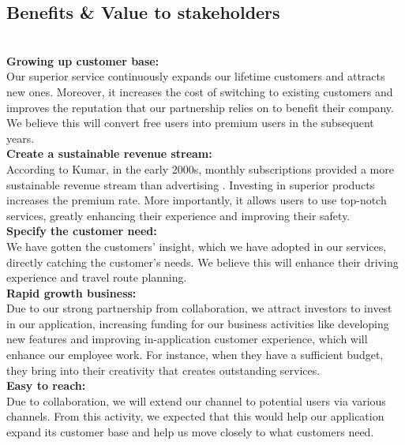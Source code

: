 \documentclass[12pt,a4paper]{article}
\begin{document}
\subsection {Benefits \& Value to stakeholders} \\
\noindent \textbf {Growing up customer base:} \\
\noindent  Our superior service continuously expands our lifetime customers and attracts new ones. Moreover, it increases the cost of switching to existing customers and improves the reputation that our partnership relies on to benefit their company. We believe this will convert free users into premium users in the subsequent years.\\

\noindent \textbf {Create a sustainable revenue stream:} \\
\noindent  According to Kumar, in the early 2000s, monthly subscriptions provided a more sustainable revenue stream than advertising \citep{task_7.2}. Investing in superior products increases the premium rate. More importantly, it allows users to use top-notch services, greatly enhancing their experience and improving their safety.\\

\noindent \textbf {Specify the customer need:} \\
\noindent  We have gotten the customers' insight, which we have adopted in our services, directly catching the customer's needs. We believe this will enhance their driving experience and travel route planning.\\

\noindent \textbf {Rapid growth business:} \\
\noindent  Due to our strong partnership from collaboration, we attract investors to invest in our application, increasing funding for our business activities like developing new features and improving in-application customer experience, which will enhance our employee work. For instance, when they have a sufficient budget, they bring into their creativity that creates outstanding services.\\

\noindent \textbf {Easy to reach:} \\
\noindent  Due to collaboration, we will extend our channel to potential users via various channels. From this activity, we expected that this would help our application expand its customer base and help us move closely to what customers need.\\
\end{document}
